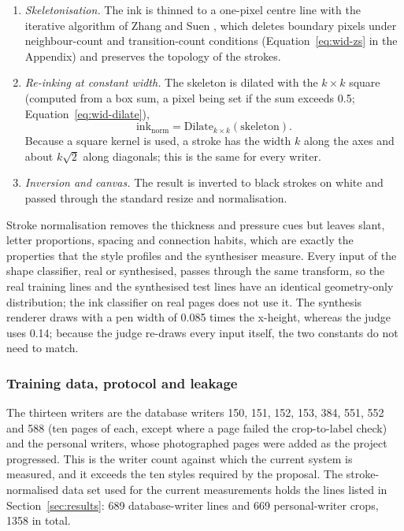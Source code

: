 \begin{enumerate}
\begin{equation}
w=\mathrm{clip}\bigl(\mathrm{round}(0.14\,x_h),\,2,\,9\bigr),\qquad k=2\lfloor w/2\rfloor+1,
\label{eq:wid-penw}
\end{equation}
where $k$ is the odd side of the structuring element that realises the width (for example $x_h=20$ gives $w=3$ and $k=3$).
\item \emph{Skeletonisation.} The ink is thinned to a one-pixel centre line with the iterative algorithm of Zhang and Suen \cite{zhang1984}, which deletes boundary pixels under neighbour-count and transition-count conditions (Equation~\ref{eq:wid-zs} in the Appendix) and preserves the topology of the strokes.
\item \emph{Re-inking at constant width.} The skeleton is dilated with the $k\times k$ square (computed from a box sum, a pixel being set if the sum exceeds 0.5; Equation~\ref{eq:wid-dilate}),
\begin{equation}
\mathrm{ink}_{\mathrm{norm}}=\mathrm{Dilate}_{k\times k}(\mathrm{skeleton}).
\label{eq:wid-dilate}
\end{equation}
Because a square kernel is used, a stroke has the width $k$ along the axes and about $k\sqrt2$ along diagonals; this is the same for every writer.
\item \emph{Inversion and canvas.} The result is inverted to black strokes on white and passed through the standard resize and normalisation.
\end{enumerate}


Stroke normalisation removes the thickness and pressure cues but leaves slant, letter proportions, spacing and connection habits, which are exactly the properties that the style profiles and the synthesiser measure.
Every input of the shape classifier, real or synthesised, passes through the same transform, so the real training lines and the synthesised test lines have an identical geometry-only distribution; the ink classifier on real pages does not use it.
The synthesis renderer draws with a pen width of 0.085 times the x-height, whereas the judge uses 0.14; because the judge re-draws every input itself, the two constants do not need to match.

\subsubsection{Training data, protocol and leakage}

The thirteen writers are the database writers 150, 151, 152, 153, 384, 551, 552 and 588 (ten pages of each, except where a page failed the crop-to-label check) and the personal writers, whose photographed pages were added as the project progressed.
This is the writer count against which the current system is measured, and it exceeds the ten styles required by the proposal.
The stroke-normalised data set used for the current measurements holds the lines listed in Section~\ref{sec:results}: 689 database-writer lines and 669 personal-writer crops, 1358 in total.

